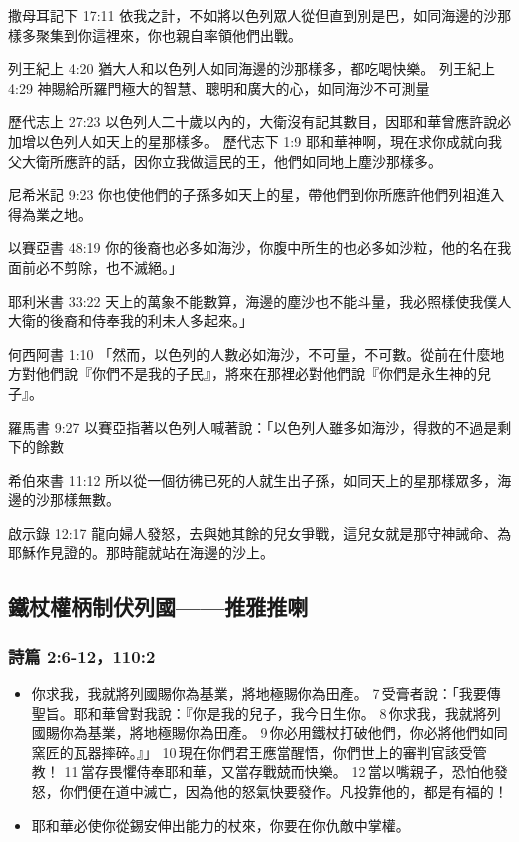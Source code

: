 撒母耳記下 17:11 依我之計，不如將以色列眾人從但直到別是巴，如同海邊的沙那樣多聚集到你這裡來，你也親自率領他們出戰。

列王紀上 4:20
猶大人和以色列人如同海邊的沙那樣多，都吃喝快樂。
列王紀上 4:29
神賜給所羅門極大的智慧、聰明和廣大的心，如同海沙不可測量

歷代志上 27:23
以色列人二十歲以內的，大衛沒有記其數目，因耶和華曾應許說必加增以色列人如天上的星那樣多。
歷代志下 1:9
耶和華神啊，現在求你成就向我父大衛所應許的話，因你立我做這民的王，他們如同地上塵沙那樣多。

尼希米記 9:23 你也使他們的子孫多如天上的星，帶他們到你所應許他們列祖進入得為業之地。

以賽亞書 48:19 你的後裔也必多如海沙，你腹中所生的也必多如沙粒，他的名在我面前必不剪除，也不滅絕。」

耶利米書 33:22
天上的萬象不能數算，海邊的塵沙也不能斗量，我必照樣使我僕人大衛的後裔和侍奉我的利未人多起來。」

何西阿書 1:10
「然而，以色列的人數必如海沙，不可量，不可數。從前在什麼地方對他們說『你們不是我的子民』，將來在那裡必對他們說『你們是永生神的兒子』。


羅馬書 9:27
以賽亞指著以色列人喊著說：「以色列人雖多如海沙，得救的不過是剩下的餘數

希伯來書 11:12
所以從一個彷彿已死的人就生出子孫，如同天上的星那樣眾多，海邊的沙那樣無數。

啟示錄 12:17
龍向婦人發怒，去與她其餘的兒女爭戰，這兒女就是那守神誡命、為耶穌作見證的。那時龍就站在海邊的沙上。







\subsection{鐵杖權柄制伏列國——推雅推喇}
\subsubsection{詩篇 2:6-12，110:2}
\begin{itemize} 
\itemsep-.25em
\item 你求我，我就將列國賜你為基業，將地極賜你為田產。
7 受膏者說：「我要傳聖旨。耶和華曾對我說：『你是我的兒子，我今日生你。
8 你求我，我就將列國賜你為基業，將地極賜你為田產。
9 你必用鐵杖打破他們，你必將他們如同窯匠的瓦器摔碎。』」
10 現在你們君王應當醒悟，你們世上的審判官該受管教！
11 當存畏懼侍奉耶和華，又當存戰兢而快樂。
12 當以嘴親子，恐怕他發怒，你們便在道中滅亡，因為他的怒氣快要發作。凡投靠他的，都是有福的！
\item 耶和華必使你從錫安伸出能力的杖來，你要在你仇敵中掌權。
\end{itemize} 

